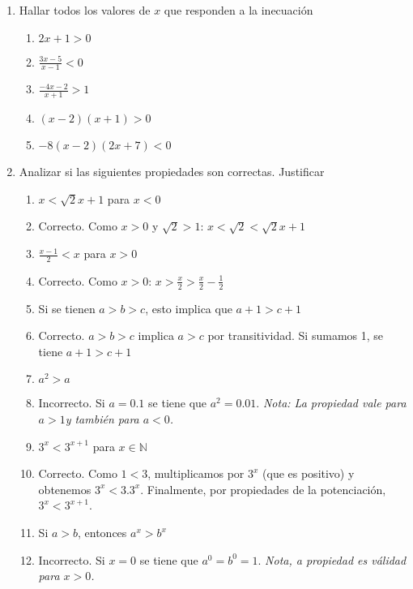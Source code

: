 \documentclass[a4paper]{article}
\newcommand{\answer}{\item[**]}
\newcommand{\exercise}{\item}
\begin{document}
\begin{enumerate}
\begin{enumerate} [label=(\alph*)]
	\end{enumerate}

	\exercise Hallar todos los valores de $x$ que responden a la inecuación
	\begin{enumerate} [label=(\alph*)]
		\item $2x+1>0$

		\item $\displaystyle\frac{3x-5}{x-1}<0$

		\item $\displaystyle\frac{-4x-2}{x+1}>1$

		\item $(x-2)(x+1)>0$

		\item $-8(x-2)(2x+7)<0$
	
	\end{enumerate}


	\exercise Analizar si las siguientes propiedades son correctas. Justificar
	\begin{multicols}{2}
	\begin{enumerate} [label=(\alph*)]
		\item $x < \sqrt{2} x +1$ para $x<0$
		\answer Correcto. Como $x>0$ y $\sqrt{2}>1$: $x < \sqrt{2} < \sqrt{2} x +1$
		
		\item $\displaystyle\frac{x-1}{2} < x$ para $x>0$
		\answer Correcto. Como $x>0$: $x > \displaystyle\frac{x}{2} > \displaystyle\frac{x}{2}-\displaystyle\frac{1}{2}$ 

		\item Si se tienen $a>b>c$, esto implica que $a+1>c+1$
		\answer	Correcto. $a>b>c$ implica $a>c$ por transitividad. Si sumamos 1, se tiene $a+1>c+1$

		\item $a^2 > a$
		\answer Incorrecto. Si $a=0.1$ se tiene que $a^2=0.01$. \textit{Nota: La propiedad vale para $a>1$y también para $a<0$.}

		\item $3^{x} < 3^{x+1}$ para $x \in \mathbb{N}$
		\answer Correcto. Como $1 < 3$, multiplicamos por $3^{x}$ (que es positivo) y obtenemos $3^{x} < 3.3^{x}$. Finalmente, por propiedades de la potenciación, $3^{x} < 3^{x+1}$.

		\item Si $a>b$, entonces $a^x > b^x$
		\answer Incorrecto. Si $x=0$ se tiene que $a^0=b^0=1$. \textit{Nota, a propiedad es válidad para $x>0$.}


\end{enumerate}
\end{multicols}
\end{enumerate}
\end{document}
